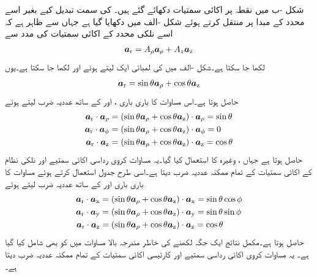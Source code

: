شکل -ب میں نقطہ  پر اکائی سمتیات دکھائے گئے ہیں۔ کی سمت تبدیل کیے بغیر اسے محدد کے مبدا پر منتقل کرتے ہوئے شکل -الف  میں دکھایا گیا ہے جہاں سے ظاہر ہے کہ اسے نلکی محدد کے اکائی سمتیات کی مدد سے
\begin{align}
\ar=A_\rho \arho+A_z \az
\end{align}
لکھا جا سکتا ہے۔شکل -الف  میں  کی لمبائی ایک لیتے ہوئے   اور  لکھا جا سکتا ہے۔یوں
\begin{align}\label{مساوات_سمتیہ_کروی_اکائی_نلکی_منتقل}
\ar=\sin \theta \arho+\cos \theta \az
\end{align}
حاصل ہوتا ہے۔اس مساوات کا باری باری ،  اور  کے ساتھ عددیہ ضرب لیتے ہوئے
\begin{gather}
\begin{aligned}\label{مساوات_سمتیہ_کروی_رداس_نلکی_اکائی_غیر_سمتی_ضرب}
\ar \cdot \arho&=(\sin \theta \arho+\cos \theta \az) \cdot \arho=\sin \theta\\
\ar \cdot \aphi&=(\sin \theta \arho+\cos \theta \az) \cdot \aphi=0\\
\ar \cdot \az&=(\sin \theta \arho+\cos \theta \az) \cdot \az=\cos \theta
\end{aligned}
\end{gather}
حاصل ہوتا ہے جہاں ،  وغیرہ کا استعمال کیا گیا۔یہ مساوات کروی رداسی اکائی سمتیے اور نلکی نظام کے اکائی سمتیات کے تمام ممکنہ عددیہ ضرب دیتا ہے۔اسی طرح جدول  استعمال کرتے ہوئے  مساوات   کا باری باری  اور  کے ساتھ عددیہ ضرب لیتے ہوئے
\begin{gather}
\begin{aligned}\label{مساوات_سمتیہ_کروی_رداس_کے_کارتیسی_اجزاء}
\ar \cdot \ax&=(\sin \theta \arho+\cos \theta \az) \cdot \ax=\sin \theta \cos \phi\\
\ar \cdot \ay&=(\sin \theta \arho+\cos \theta \az) \cdot \ay=\sin \theta \sin \phi\\
\ar \cdot \az&=(\sin \theta \arho+\cos \theta \az) \cdot \az=\cos \theta
\end{aligned}
\end{gather}
حاصل ہوتا ہے۔مکمل نتائج ایک جگہ لکھنے کی خاطر  مندرجہ بالا مساوات میں   کو بھی شامل کیا گیا ہے۔ یہ مساوات کروی اکائی رداسی  سمتیے  اور کارتیسی اکائی سمتیات کے تمام ممکنہ عددیہ ضرب دیتا ہے۔


